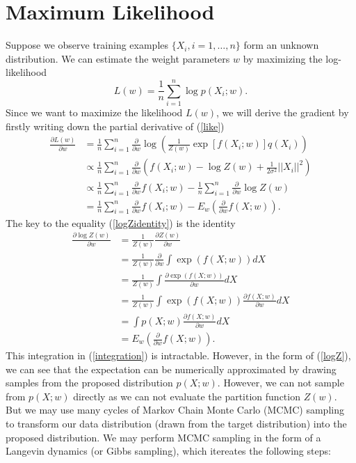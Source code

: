 \documentclass[11pt]{article}
\def\L{L}
\def\I{X}
\begin{document}
\section{Maximum Likelihood}
Suppose we observe training examples $\{\I_i, i=1,\ldots,n\}$ form an unknown distribution. We can estimate the weight parameters $w$ by maximizing the log-likelihood
\begin{equation}
\L(w) = \frac{1}{n} \sum_{i=1}^n \log p(\I_i;w) \label{like}.
\end{equation}
Since we want to maximize the likelihood $\L(w)$, we will derive the gradient by firstly writing down the partial derivative of (\ref{like})
\begin{align}
\frac{\partial\L(w)}{\partial w}
&= \frac{1}{n} \sum_{i=1}^n \frac{\partial}{\partial w} \log \left( \frac{1}{Z(w)}\exp\left[ f(\I_i;w) \right]q(\I_i) \right) \\
& \propto \frac{1}{n} \sum_{i=1}^n \frac{\partial}{\partial w} \left(f(\I_i;w) -\log Z(w)  + \frac{1}{2\sigma^2}||\I_i ||^2 \right) \\
& \propto \frac{1}{n} \sum_{i=1}^n \frac{\partial}{\partial w} f(\I_i;w) - \frac{1}{n} \sum_{i=1}^n \frac{\partial}{\partial w} \log Z(w) \label{logZidentity} \\ 
& = \frac{1}{n} \sum_{i=1}^n \frac{\partial}{\partial w} f(\I_i;w) - E_w(\frac{\partial}{\partial w} f(\I;w)). \label{gradientlike}
\end{align}
The key to the equality (\ref{logZidentity}) is the identity
\begin{align}
\frac{\partial\log Z(w)}{\partial w}
&= \frac{1}{Z(w)}\frac{\partial Z(w)}{\partial w}\\
&= \frac{1}{Z(w)}\frac{\partial}{\partial w}\int \exp(f(\I;w))d\I\\
&= \frac{1}{Z(w)}\int \frac{\partial \exp(f(\I;w))}{\partial w} d\I\\
&= \frac{1}{Z(w)}\int \exp(f(\I;w))\frac{\partial f(\I;w)}{\partial w}d\I\\
&= \int p(\I;w) \frac{\partial f(\I;w)}{\partial w}d\I \label{integration} \\ 
&= E_w(\frac{\partial}{\partial w} f(\I;w)). \label{logZ}
\end{align}
This integration in (\ref{integration}) is intractable. However, in the form of (\ref{logZ}), we can see that the expectation can be numerically approximated by drawing samples from the proposed distribution $p(\I;w)$. However, we can not sample from $p(\I;w)$ directly as we can not evaluate the partition function $Z(w)$. But we may use many cycles of Markov Chain Monte Carlo (MCMC) sampling to transform our data distribution (drawn from the target distribution) into the proposed distribution. We may perform MCMC sampling in the form of a Langevin dynamics (or Gibbs sampling), which itereates the following steps:
\end{document}
